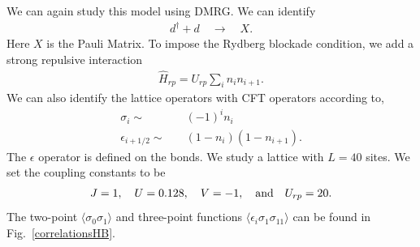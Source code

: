 \documentclass[prb,twocolumn,11pt]{revtex4-1}
\begin{document}
We can again study this model using DMRG. We can identify 
\begin{align}
    d^{\dagger}+d \quad \rightarrow  \quad X.
\end{align}
Here $X$ is the Pauli Matrix. 
To impose the Rydberg blockade condition, we add a strong repulsive interaction 
\begin{align}
    \hat{H}_{rp}=U_{rp} \sum_i n_i n_{i+1}.
\end{align}
We can also identify the lattice operators with CFT operators according to,
\begin{align}   
    \sigma_i \sim &\quad  (-1)^i n_i \nonumber\\
    \epsilon_{i+1/2} \sim & \quad (1-n_{i})(1-n_{i+1}).
\end{align}
The $\epsilon$ operator is defined on the bonds. 
We study a lattice with $L=40$ sites. We set the coupling constants to be 
\begin{align}
    J=1,\quad U=0.128, \quad V=-1, \quad {\rm and}\quad U_{rp}=20.
\end{align}
The two-point $\langle\sigma_0 \sigma_1\rangle$ and three-point functions  $\langle \epsilon_i \sigma_1 \sigma_{11}\rangle$ can be found in Fig.~\ref{correlationsHB}.
\end{document}
